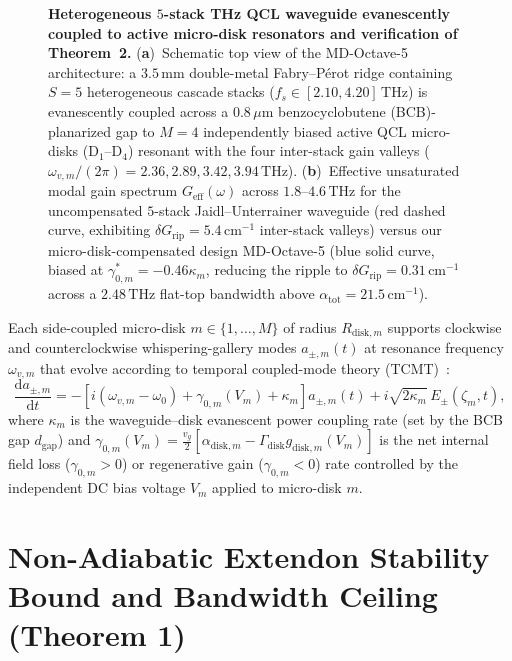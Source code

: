 \documentclass[11pt,letterpaper]{article}
\begin{document}
\begin{figure}[t!]
\centering
\resizebox{0.97\textwidth}{!}{}
\caption{\textbf{Heterogeneous $5$-stack THz QCL waveguide evanescently coupled to active micro-disk resonators and verification of Theorem~2.} (\textbf{a})~Schematic top view of the MD-Octave-5 architecture: a $3.5\,\mathrm{mm}$ double-metal Fabry--P\'erot ridge containing $S = 5$ heterogeneous cascade stacks ($f_s \in [2.10, 4.20]\,\mathrm{THz}$) is evanescently coupled across a $0.8\,\mu\mathrm{m}$ benzocyclobutene (BCB)-planarized gap to $M = 4$ independently biased active QCL micro-disks ($\mathrm{D}_1$--$\mathrm{D}_4$) resonant with the four inter-stack gain valleys ($\omega_{v,m}/(2\pi) = 2.36, 2.89, 3.42, 3.94\,\mathrm{THz}$). (\textbf{b})~Effective unsaturated modal gain spectrum $G_{\mathrm{eff}}(\omega)$ across $1.8\text{--}4.6\,\mathrm{THz}$ for the uncompensated $5$-stack Jaidl--Unterrainer waveguide (red dashed curve, exhibiting $\delta G_{\mathrm{rip}} = 5.4\,\mathrm{cm}^{-1}$ inter-stack valleys) versus our micro-disk-compensated design MD-Octave-5 (blue solid curve, biased at $\gamma_{0,m}^* = -0.46\kappa_m$, reducing the ripple to $\delta G_{\mathrm{rip}} = 0.31\,\mathrm{cm}^{-1}$ across a $2.48\,\mathrm{THz}$ flat-top bandwidth above $\alpha_{\mathrm{tot}} = 21.5\,\mathrm{cm}^{-1}$).}
\label{fig:multistack_tcmt}
\end{figure}

Each side-coupled micro-disk $m \in \{1, \dots, M\}$ of radius $R_{\mathrm{disk},m}$ supports clockwise and counterclockwise whispering-gallery modes $a_{\pm,m}(t)$ at resonance frequency $\omega_{v,m}$ that evolve according to temporal coupled-mode theory (TCMT)~\cite{Haus1984,Yariv2000}:
\begin{equation}
\frac{\mathrm{d}a_{\pm,m}}{\mathrm{d}t} = -\left[ i(\omega_{v,m} - \omega_0) + \gamma_{0,m}(V_m) + \kappa_m \right] a_{\pm,m}(t) + i\sqrt{2\kappa_m}\,E_\pm(\zeta_m, t),
\label{eq:tcmt_disk}
\end{equation}
where $\kappa_m$ is the waveguide--disk evanescent power coupling rate (set by the BCB gap $d_{\mathrm{gap}}$) and $\gamma_{0,m}(V_m) = \frac{v_g}{2}[\alpha_{\mathrm{disk},m} - \Gamma_{\mathrm{disk}} g_{\mathrm{disk},m}(V_m)]$ is the net internal field loss ($\gamma_{0,m} > 0$) or regenerative gain ($\gamma_{0,m} < 0$) rate controlled by the independent DC bias voltage $V_m$ applied to micro-disk $m$.

\section{Non-Adiabatic Extendon Stability Bound and Bandwidth Ceiling (Theorem 1)}
\label{sec:theorem1}
\end{document}
